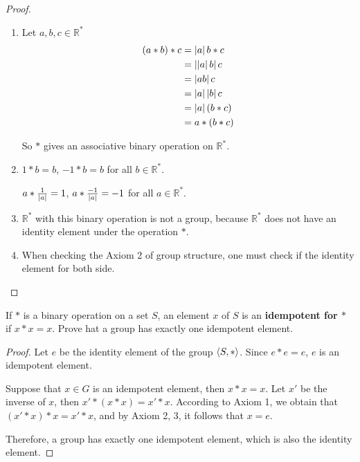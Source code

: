 \begin{proof}
    \begin{enumerate}[label={\textbf{\alph*.}}]
        \item Let $a, b, c\in\mathbb{R}^{*}$
              \begin{align*}
                  (a * b) * c & = \left\vert{a}\right\vert b * c    \\
                              & = \left\vert{\left\vert{a}\right\vert b}\right\vert c \\
                              & = \left\vert{ab}\right\vert c       \\
                              & = \left\vert{a}\right\vert\left\vert{b}\right\vert c \\
                              & = \left\vert{a}\right\vert(b * c)  \\
                              & = a * (b * c)
              \end{align*}

              So $*$ gives an associative binary operation on $\mathbb{R}^{*}$.
        \item $1 * b = b$, $-1 * b = b$ for all $b\in\mathbb{R}^{*}$.

              $a * \frac{1}{\left\vert{a}\right\vert} = 1$, $a * \frac{-1}{\left\vert{a}\right\vert} = -1$ for all $a\in\mathbb{R}^{*}$.
        \item $\mathbb{R}^{*}$ with this binary operation is not a group, because $\mathbb{R}^{*}$ does not have an identity element under the operation $*$.
        \item When checking the Axiom 2 of group structure, one must check if the identity element for both side.
    \end{enumerate}
\end{proof}

\newpage
\begin{exercise}
    If $*$ is a binary operation on a set $S$, an element $x$ of $S$ is an \textbf{idempotent for $*$} if $x * x = x$. Prove hat a group has exactly one idempotent element.
\end{exercise}

\begin{proof}
    Let $e$ be the identity element of the group $\left\langle{S, *}\right\rangle$. Since $e * e = e$, $e$ is an idempotent element.

    Suppose that $x\in G$ is an idempotent element, then $x * x = x$. Let $x'$ be the inverse of $x$, then $x' * (x * x) = x' * x$. According to Axiom 1, we obtain that $(x' * x) * x = x' * x$, and by Axiom 2, 3, it follows that $x = e$.

    Therefore, a group has exactly one idempotent element, which is also the identity element.
\end{proof}

